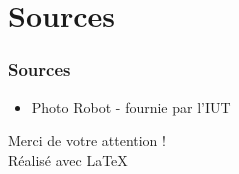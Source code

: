 \section{Sources}

\begin{frame}{}
    \frametitle{Sources}

    \begin{itemize}
        \item Photo Robot - fournie par l'IUT
    \end{itemize}

    \vfill
    \centering
    Merci de votre attention !
    \\ Réalisé avec \LaTeX
\end{frame}